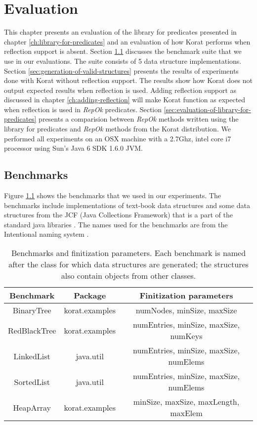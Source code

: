 \chapter{Evaluation}
\label{ch:evaluation}
This chapter presents an evaluation of the library for predicates
presented in chapter \ref{ch:library-for-predicates} and an evaluation
of how Korat performs when reflection support is absent. Section
\ref{sec:benchmarks} discusses the benchmark suite that we use in our
evaluations. The suite consists of 5 data structure
implementations. Section \ref{sec:generation-of-valid-structures}
presents the results of experiments done with Korat without reflection
support. The results show how Korat does not output expected results
when reflection is used. Adding reflection support as discussed in
chapter \ref{ch:adding-reflection} will make Korat function as
expected when reflection is used in \emph{RepOk} predicates. Section
\ref{sec:evaluation-of-library-for-predicates} presents a comparision
between \emph{RepOk} methods written using the library for predicates
and \emph{RepOk} methods from the Korat distribution. We performed all
experiments on an OSX machine with a 2.7Ghz, intel core i7 processor
using Sun’s Java 6 SDK 1.6.0 JVM.


\section{Benchmarks}
\label{sec:benchmarks}
Figure \ref{fig:benchmarksAndFinitizationParams} shows the benchmarks
that we used in our experiments. The benchmarks include
implementations of text-book data structures and some data structures
from the JCF (Java Collections Framework) that is a part of the
standard java libraries \cite{Linden:2004:JJJ:993931}. The names used for the benchmarks
are from the Intentional naming system \cite{adjie1999design}.

\begin{table}[h]
\begin{tabular}{|c|c|c|}
\hline
Benchmark    & Package        & Finitization parameters                \\ \hline
BinaryTree   & korat.examples & numNodes, minSize, maxSize             \\ \hline
RedBlackTree & korat.examples & numEntries, minSize, maxSize, numKeys  \\ \hline
LinkedList   & java.util      & numEntries, minSize, maxSize, numElems \\ \hline
SortedList   & java.util      & numEntries, minSize, maxSize, numElems \\ \hline
HeapArray    & korat.examples & minSize, maxSize, maxLength, maxElem   \\ \hline
\end{tabular}
\caption{Benchmarks and finitization parameters. Each benchmark is
  named after the class for which data structures are generated; the
  structures also contain objects from other classes.}
\label{fig:benchmarksAndFinitizationParams}
\end{table}

